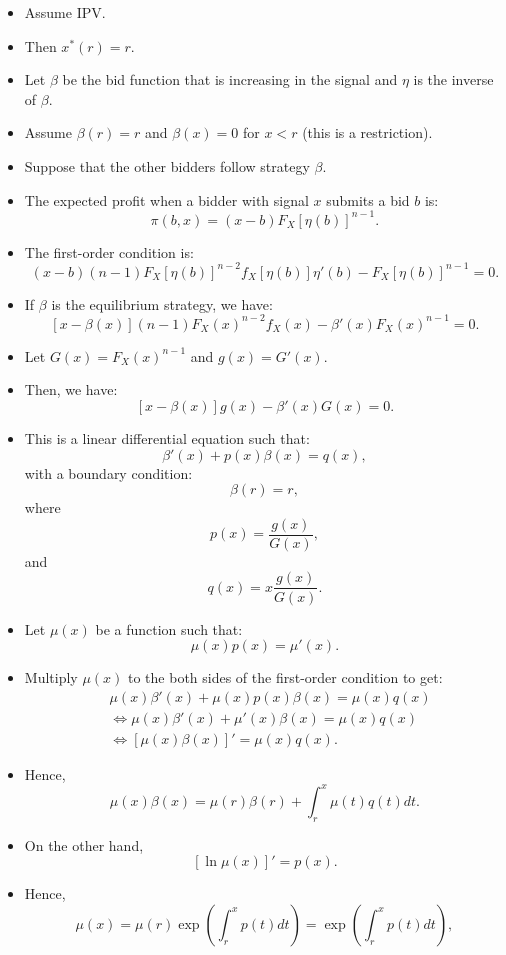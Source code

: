 \documentclass[
]{book}
\begin{document}
\begin{itemize}
\item
  Assume IPV.
\item
  Then \(x^*(r) = r\).
\item
  Let \(\beta\) be the bid function that is increasing in the signal and \(\eta\) is the inverse of \(\beta\).
\item
  Assume \(\beta(r) = r\) and \(\beta(x) = 0\) for \(x < r\) (this is a restriction).
\item
  Suppose that the other bidders follow strategy \(\beta\).
\item
  The expected profit when a bidder with signal \(x\) submits a bid \(b\) is:
  \[
  \pi(b, x) = (x - b) F_X[\eta(b)]^{n - 1}.
  \]
\item
  The first-order condition is:
  \[
  (x - b) (n - 1) F_X[\eta(b)]^{n - 2} f_X[\eta(b)] \eta'(b)- F_X[\eta(b)]^{n - 1} = 0.
  \]
\item
  If \(\beta\) is the equilibrium strategy, we have:
  \[
  [x - \beta(x)] (n - 1) F_X(x)^{n - 2} f_X(x) - \beta'(x) F_X(x)^{n - 1} = 0.
  \]
\item
  Let \(G(x) = F_X(x)^{n - 1}\) and \(g(x) = G'(x)\).
\item
  Then, we have:
  \[
  [x - \beta(x)] g(x) - \beta'(x) G(x) = 0.
  \]
\item
  This is a linear differential equation such that:
  \[
  \beta'(x) + p(x) \beta(x) = q(x),
  \]
  with a boundary condition:
  \[
  \beta(r) = r,
  \]
  where
  \[
  p(x) = \frac{g(x)}{G(x)},
  \]
  and
  \[
  q(x) = x \frac{g(x)}{G(x)}.
  \]
\item
  Let \(\mu(x)\) be a function such that:
  \[
  \mu(x) p(x) = \mu'(x).
  \]
\item
  Multiply \(\mu(x)\) to the both sides of the first-order condition to get:
  \[
  \begin{split}
  &\mu(x) \beta'(x) + \mu(x) p(x) \beta(x) = \mu(x) q(x)\\
  &\Leftrightarrow \mu(x) \beta'(x) + \mu'(x) \beta(x) = \mu(x) q(x)\\
  &\Leftrightarrow [\mu(x) \beta(x)]' = \mu(x) q(x).
  \end{split}
  \]
\item
  Hence,
  \[
  \mu(x) \beta(x) = \mu(r) \beta(r) + \int_{r}^x \mu(t) q(t) dt.
  \]
\item
  On the other hand,
  \[
  [\ln \mu(x)]' = p(x).
  \]
\item
  Hence,
  \[
  \mu(x) = \mu(r) \exp\left(\int_{r}^x p(t) dt  \right) = \exp\left(\int_{r}^x p(t) dt  \right),
\]
\end{itemize}
\end{document}
